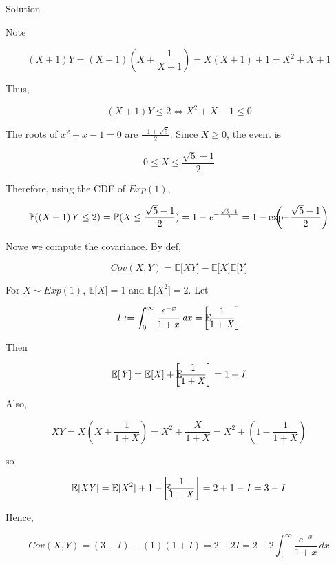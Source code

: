 \begin{qlsolution}{Solution}

Note

\[(\mathit{X} + 1)\mathit{Y} = (\mathit{X} + 1)\left( {\mathit{X} + \frac{1}{\mathit{X} + 1}} \right) = \mathit{X}(\mathit{X} + 1) + 1 = \mathit{X}^{2} + \mathit{X} + 1\]

Thus,

\[(\mathit{X} + 1)\mathit{Y} \leq 2\Leftrightarrow\mathit{X}^{2} + \mathit{X} - 1 \leq 0\]

The roots of \(\mathit{x}^{2} + \mathit{x} - 1 = 0\) are \(\frac{- 1 \pm \sqrt{5}}{2}\). Since \(\mathit{X} \geq 0\), the event is

\[0 \leq \mathit{X} \leq \frac{\sqrt{5} - 1}{2}\]

Therefore, using the CDF of \(Exp(1)\),

\[\mathbb{P}((\mathit{X} + 1)\mathit{Y} \leq 2) = \mathbb{P}(\mathit{X} \leq \frac{\sqrt{5} - 1}{2}) = 1 - \mathit{e}^{- \frac{\sqrt{5} - 1}{2}} = 1 - \exp\mspace{-18mu}\left( {- \frac{\sqrt{5} - 1}{2}} \right)\]

Nowe we compute the covariance. By def,

\[Cov(\mathit{X},\mathit{Y}) = \mathbb{E}\lbrack\mathit{X}\mathit{Y}\rbrack - \mathbb{E}\lbrack\mathit{X}\rbrack\mathbb{E}\lbrack\mathit{Y}\rbrack\]

For \(\mathit{X} \sim Exp(1)\), \(\mathbb{E}\lbrack\mathit{X}\rbrack = 1\) and \(\mathbb{E}\lbrack\mathit{X}^{2}\rbrack = 2\). Let

\[\mathit{I} := \int_{0}^{\infty}\frac{\mathit{e}^{- \mathit{x}}}{1 + \mathit{x}}\,\mathit{d}\mathit{x} = \mathbb{E}\mspace{-18mu}\left\lbrack \frac{1}{1 + \mathit{X}} \right\rbrack\]

Then

\[\mathbb{E}\lbrack\mathit{Y}\rbrack = \mathbb{E}\lbrack\mathit{X}\rbrack + \mathbb{E}\mspace{-18mu}\left\lbrack \frac{1}{1 + \mathit{X}} \right\rbrack = 1 + \mathit{I}\]

Also,

\[\mathit{X}\mathit{Y} = \mathit{X}\left( {\mathit{X} + \frac{1}{1 + \mathit{X}}} \right) = \mathit{X}^{2} + \frac{\mathit{X}}{1 + \mathit{X}} = \mathit{X}^{2} + \left( {1 - \frac{1}{1 + \mathit{X}}} \right)\]

so

\[\mathbb{E}\lbrack\mathit{X}\mathit{Y}\rbrack = \mathbb{E}\lbrack\mathit{X}^{2}\rbrack + 1 - \mathbb{E}\mspace{-18mu}\left\lbrack \frac{1}{1 + \mathit{X}} \right\rbrack = 2 + 1 - \mathit{I} = 3 - \mathit{I}\]

Hence,

\[Cov(\mathit{X},\mathit{Y}) = (3 - \mathit{I}) - (1)(1 + \mathit{I}) = 2 - 2\mathit{I} = 2 - 2\int_{0}^{\infty}\frac{\mathit{e}^{- \mathit{x}}}{1 + \mathit{x}}\,\mathit{d}\mathit{x}\]

\end{qlsolution}

